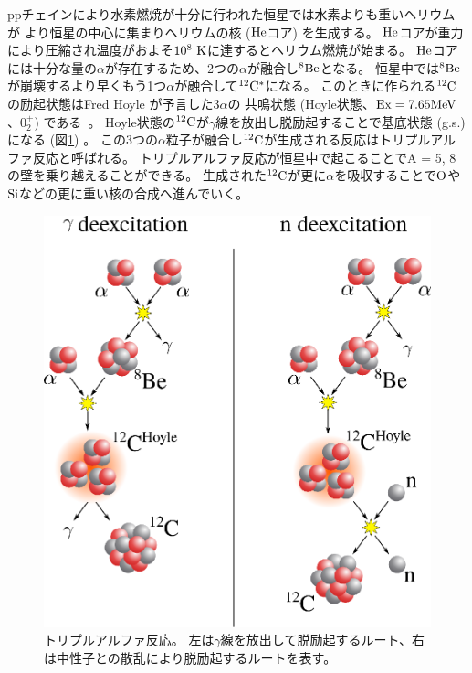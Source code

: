 ppチェインにより水素燃焼が十分に行われた恒星では水素よりも重いヘリウムが
より恒星の中心に集まりヘリウムの核 (${\rm He}$コア) を生成する。
${\rm He}$コアが重力により圧縮され温度がおよそ$10^8~{\rm K}$に達するとヘリウム燃焼が始まる。
${\rm He}$コアには十分な量の$\alpha$が存在するため、2つの$\alpha$が融合し${}^{8}{\rm Be}$となる。
恒星中では${}^{8}{\rm Be}$が崩壊するより早くもう1つ$\alpha$が融合して${}^{12}{\rm C}^{*}$になる。
このときに作られる${}^{12}{\rm C}$の励起状態はFred Hoyle が予言した$3\alpha$の
共鳴状態 (Hoyle状態、${\rm Ex} = 7.65{\rm MeV}$、$0_{2}^{+}$) である~\cite{hoyle_state}。
Hoyle状態の${}^{12}{\rm C}$が$\gamma$線を放出し脱励起することで基底状態 (g.s.) になる (図\ref{fig::triple_alpha}) 。
この3つの$\alpha$粒子が融合し${}^{12}{\rm C}$が生成される反応はトリプルアルファ反応と呼ばれる。
トリプルアルファ反応が恒星中で起こることでA = 5, 8の壁を乗り越えることができる。
生成された${}^{12}{\rm C}$が更に$\alpha$を吸収することで${\rm O}$や${\rm Si}$などの更に重い核の合成へ進んでいく。

\begin{figure}
  \centering
  \includegraphics[clip, width=0.7\columnwidth]{eps/triple_alpha.eps}
  \caption[トリプルアルファ反応。]{トリプルアルファ反応。
    左は$\gamma$線を放出して脱励起するルート、右は中性子との散乱により脱励起するルートを表す。}
  \label{fig::triple_alpha}
\end{figure}

